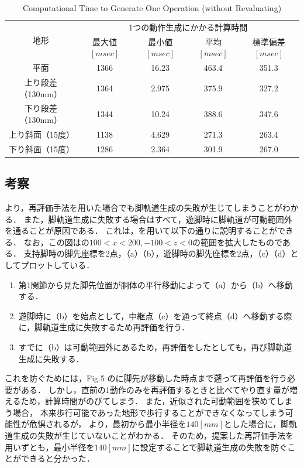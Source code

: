 \begin{table}[htbp]
  \caption{Computational Time to Generate One Operation (without Revaluating)}
  \label{tab:ch5_calc_time_140mm}  %
  \centering
  \begin{tabular}{|c||c|c|c|c|} \hline  %
    \multirow{2}{*}{地形} & \multicolumn{4}{c|}{1つの動作生成にかかる計算時間} \\ \cline{2-5}  %
     & 最大値 $[msec]$ & 最小値 $[msec]$ & 平均 $[msec]$ & 標準偏差 $[msec]$ \\ \hline \hline  %
    平面 & 1366 & 16.23 & 463.4 & 351.3 \\ \hline %
    上り段差（130mm）& 1364 & 2.975 & 375.9 & 327.2 \\ \hline %
    下り段差（130mm）& 1344 & 10.24 & 388.6 & 347.6 \\ \hline %
    上り斜面（15度） & 1138 & 4.629 & 271.3 & 263.4 \\ \hline %
    下り斜面（15度） & 1286 & 2.364 & 301.9 & 267.0 \\ \hline %
  \end{tabular}
\end{table}

\subsection{考察}
より，再評価手法を用いた場合でも脚軌道生成の失敗が生じてしまうことがわかる．
また，脚軌道生成に失敗する場合はすべて，遊脚時に脚軌道が可動範囲外を通ることが原因である．
これは，を用いて以下の通りに説明することができる．
なお，この図はの$100<x<200,-100<z<0$の範囲を拡大したものである．
支持脚時の脚先座標を2点，（a）（b），遊脚時の脚先座標を2点，（c）（d）としてプロットしている．

\begin{enumerate}
  \item 第1関節から見た脚先位置が胴体の平行移動によって（a）から（b）へ移動する．
  \item 遊脚時に（b）を始点として，中継点（c）を通って終点（d）へ移動する際に，脚軌道生成に失敗するため再評価を行う．
  \item すでに（b）は可動範囲外にあるため，再評価をしたとしても，再び脚軌道生成に失敗する．
\end{enumerate}

これを防ぐためには，Fig.5 のに脚先が移動した時点まで遡って再評価を行う必要がある．
しかし，直前の1動作のみを再評価するときと比べてやり直す量が増えるため，計算時間がのびてしまう．
また，近似された可動範囲を狭めてしまう場合，
本来歩行可能であった地形で歩行することができなくなってしまう可能性が危惧されるが，
より，最初から最小半径を$140 [mm]$とした場合に，脚軌道生成の失敗が生じていないことがわかる．
そのため，提案した再評価手法を用いずとも，最小半径を$140 [mm]$に設定することで脚軌道生成の失敗を防ぐことができると分かった．

